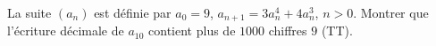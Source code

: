La suite $(a_n)$ est définie par $a_0 = 9$, $a_{n+1} = 3a_n^4 + 4a_n^3$, $n > 0$. Montrer que l'écriture décimale de $a_{10}$ contient plus de $1000$ chiffres $9$ (TT).
